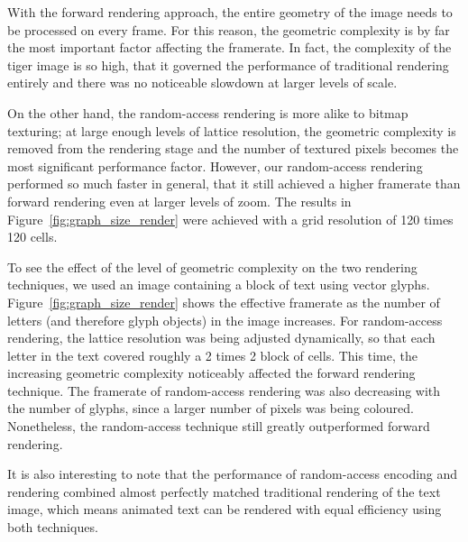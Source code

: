 \documentclass[11pt,a4paper,twoside]{article}
\begin{document}
With the forward rendering approach, the entire geometry of the image needs to be processed on every frame. For this reason, the geometric complexity is by far the most important factor affecting the framerate. In fact, the complexity of the tiger image is so high, that it governed the performance of traditional rendering entirely and there was no noticeable slowdown at larger levels of scale.

On the other hand, the random-access rendering is more alike to bitmap texturing; at large enough levels of lattice resolution, the geometric complexity is removed from the rendering stage and the number of textured pixels becomes the most significant performance factor. However, our random-access rendering performed so much faster in general, that it still achieved a higher framerate than forward rendering even at larger levels of zoom. The results in Figure~\ref{fig:graph_size_render} were achieved with a grid resolution of 120 times 120 cells.

To see the effect of the level of geometric complexity on the two rendering techniques, we used an image containing a block of text using vector glyphs. Figure~\ref{fig:graph_size_render} shows the effective framerate as the number of letters (and therefore glyph objects) in the image increases. For random-access rendering, the lattice resolution was being adjusted dynamically, so that each letter in the text covered roughly a 2 times 2 block of cells. This time, the increasing geometric complexity noticeably affected the forward rendering technique. The framerate of random-access rendering was also decreasing with the number of glyphs, since a larger number of pixels was being coloured. Nonetheless, the random-access technique still greatly outperformed forward rendering.

It is also interesting to note that the performance of random-access encoding and rendering combined almost perfectly matched traditional rendering of the text image, which means animated text can be rendered with equal efficiency using both techniques.
\end{document}
